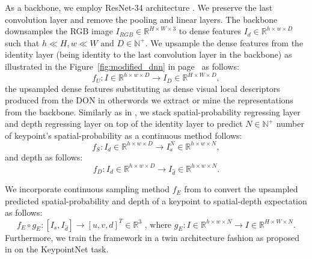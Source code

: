 As a backbone, we employ ResNet-34 architecture \cite{resnet}.
We preserve the last convolution layer and remove the pooling and linear layers.
The backbone downsamples the RGB image $I_{RGB} \in \mathbb{R}^{H \times W \times 3}$
to dense features $I_d \in \mathbb{R}^{h \times w \times D}$
such that $ h \ll H, w \ll W \text{ and } D \in \mathbb{N}^+$.
We upsample the dense features from the identity layer
(being identity to the last convolution layer in the backbone) as illustrated in the Figure~\ref{fig:modified_dnn} in page~\pageref{fig:modified_dnn} as follows:
\begin{equation}
    f_U: I \in \mathbb{R}^{h \times w \times D} \rightarrow I_D \in \mathbb{R}^{H \times W \times D},
\end{equation}
the upsampled dense features substituting as dense visual local descriptors produced from the DON in otherwords
we extract or mine the representations from the backbone.
Similarly as in \cite{suwajanakorn2018discovery}, we stack spatial-probability regressing layer and
depth regressing layer on top of the identity layer to predict $N \in \mathbb{N}^+$ number of keypoint's spatial-probability as a continuous method follows:
\begin{equation}
    f_S: I_d \in \mathbb{R}^{h \times w \times D} \rightarrow I_s^N \in \mathbb{R}^{h \times w \times N},
\end{equation}
and depth as follows:
\begin{equation}
    f_D: I_d \in \mathbb{R}^{h \times w \times D} \rightarrow I_{\hat{d}} \in \mathbb{R}^{h \times w \times N}.
\end{equation}

We incorporate continuous sampling method $f_E$ from \parencites{florence2020dense}{suwajanakorn2018discovery}
to convert the upsampled predicted spatial-probability and depth of a keypoint to spatial-depth expectation as follows:
\begin{equation}
    f_E \circ g_E:[I_s, I_{\hat{d}}] \rightarrow [u, v, d]^T \in \mathbb{R}^3 \text{ , where }  g_E: I \in \mathbb{R}^{h \times w \times N} \rightarrow I \in \mathbb{R}^{H \times W \times N}.
\end{equation}
Furthermore, we train the framework in a twin architecture fashion as proposed in
\parencites{chen2020simple}{zbontar2021barlow}{florence2018dense}{florence2020dense}{kupcsik2021supervised}{adrian2022efficient}{hadjivelichkov2021fully}{nerf-Supervision}
on the KeypointNet task.

